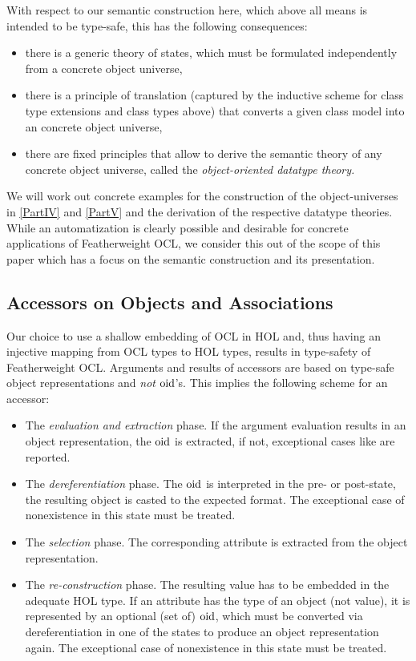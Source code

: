 With respect to our semantic construction here,
which above all means is intended to be type-safe, this has the following consequences:
\begin{itemize}
\item there is a generic theory of states, which must be formulated independently
      from a concrete object universe,
\item there is a principle of translation (captured by the inductive scheme for
      class type extensions and class types above) that converts a given class model
      into an concrete object universe,
\item there are fixed principles that allow to derive the semantic theory of any
      concrete object universe, called the \emph{object-oriented datatype theory.}
\end{itemize}
We will work out concrete examples for the construction of the
object-universes in \autoref{PartIV} and \autoref{PartV} and the
derivation of the respective datatype theories. While an
automatization is clearly possible and desirable for concrete
applications of Featherweight OCL, we consider this out of the scope
of this paper which has a focus on the semantic construction and its
presentation.


\subsection{Accessors on Objects and Associations}
Our choice to use a shallow embedding of OCL in HOL and, thus having
an injective mapping from OCL types to HOL types, results in
type-safety of Featherweight OCL\@. Arguments and results of accessors
are based on type-safe object representations and \emph{not} $\mathrm{oid}$'s.
This implies the following scheme for an accessor:
\begin{itemize}
\item The \emph{evaluation and extraction} phase. If the argument
  evaluation results in an object representation, the $\mathrm{oid}$ is
  extracted, if not, exceptional cases like  are
  reported.
\item The \emph{dereferentiation} phase. The $\mathrm{oid}$ is interpreted in
  the pre- or post-state, %
  the resulting object is casted to the expected format.  The
  exceptional case of nonexistence in this state must be treated.
\item The \emph{selection} phase. The corresponding attribute is
  extracted from the object representation.
\item The \emph{re-construction} phase.  The resulting value has to be
  embedded in the adequate HOL type.  If an attribute has the type of
  an object (not value), it is represented by an optional (set of)
  $\mathrm{oid}$, which must be converted via dereferentiation in one of the
  states to produce an object representation again. The
  exceptional case of nonexistence in this state must be treated.
\end{itemize}

